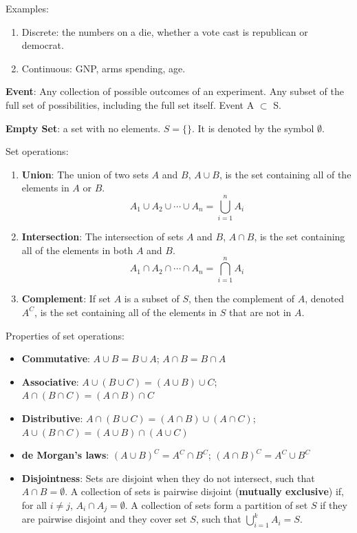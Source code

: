 \documentclass[
]{book}
\providecommand{\tightlist}{%
  \setlength{\itemsep}{0pt}\setlength{\parskip}{0pt}}
\theoremstyle{definition}
\theoremstyle{definition}
\theoremstyle{definition}
\theoremstyle{remark}
\begin{document}
Examples:

\begin{enumerate}
\def\labelenumi{\arabic{enumi}.}
\tightlist
\item
  Discrete: the numbers on a die, whether a vote cast is republican or democrat.
\item
  Continuous: GNP, arms spending, age.
\end{enumerate}

\textbf{Event}: Any collection of possible outcomes of an experiment. Any subset of the full set of possibilities, including the full set itself. Event A \(\subset\) S.

\textbf{Empty Set}: a set with no elements. \(S = \{\}\). It is denoted by the symbol \(\emptyset\).

Set operations:

\begin{enumerate}
\def\labelenumi{\arabic{enumi}.}
\tightlist
\item
  \textbf{Union}: The union of two sets \(A\) and \(B\), \(A \cup B\), is the set containing all of the elements in \(A\) or \(B\). \[A_1 \cup A_2  \cup \cdots \cup A_n = \bigcup_{i=1}^n A_i\]
\item
  \textbf{Intersection}: The intersection of sets \(A\) and \(B\), \(A \cap B\), is the set containing all of the elements in both \(A\) and \(B\). \[A_1 \cap A_2  \cap \cdots \cap A_n = \bigcap_{i=1}^n A_i\]
\item
  \textbf{Complement}: If set \(A\) is a subset of \(S\), then the complement of \(A\), denoted \(A^C\), is the set containing all of the elements in \(S\) that are not in \(A\).
\end{enumerate}

Properties of set operations:

\begin{itemize}
\tightlist
\item
  \textbf{Commutative}: \(A \cup B = B \cup A\); \(A \cap B = B \cap A\)
\item
  \textbf{Associative}: \(A \cup (B \cup C) = (A \cup B) \cup C\); \(A \cap (B \cap C) = (A \cap B) \cap C\)
\item
  \textbf{Distributive}: \(A \cap (B \cup C) = (A \cap B) \cup (A \cap C)\); \(A \cup (B \cap C) = (A \cup B) \cap (A \cup C)\)
\item
  \textbf{de Morgan's laws}: \((A \cup B)^C = A^C \cap B^C\); \((A \cap B)^C = A^C \cup B^C\)
\item
  \textbf{Disjointness}: Sets are disjoint when they do not intersect, such that \(A \cap B = \emptyset\). A collection of sets is pairwise disjoint (\textbf{mutually exclusive}) if, for all \(i \neq j\), \(A_i \cap A_j = \emptyset\). A collection of sets form a partition of set \(S\) if they are pairwise disjoint and they cover set \(S\), such that \(\bigcup_{i = 1}^k A_i = S\).
\end{itemize}
\end{document}
